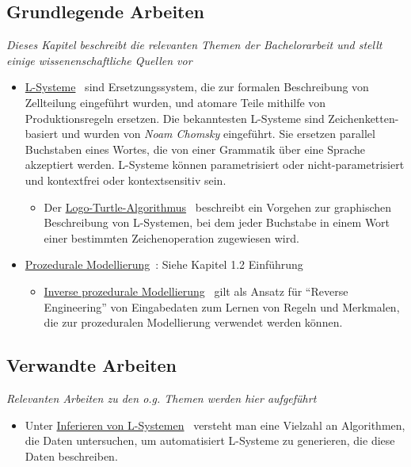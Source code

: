 \documentclass[11pt]{article}
\begin{document}
    \subsection{Grundlegende Arbeiten}
    \textit{Dieses Kapitel beschreibt die relevanten Themen der Bachelorarbeit und stellt einige wissenenschaftliche
    Quellen vor}
    \begin{itemize}
        \item[\ding{46}] \underline{L-Systeme}~\cite{2} sind Ersetzungssystem, die zur
        formalen Beschreibung von Zellteilung eingeführt wurden, und atomare Teile mithilfe von Produktionsregeln
        ersetzen. Die bekanntesten L-Systeme sind Zeichenketten-basiert und wurden von \textit{Noam Chomsky} eingeführt.
        Sie ersetzen parallel Buchstaben eines Wortes, die von einer Grammatik über eine Sprache akzeptiert werden.
        L-Systeme können parametrisiert oder nicht-parametrisiert und kontextfrei oder kontextsensitiv sein.
        \begin{itemize}
            \item[\ding{237}] Der \underline{Logo-Turtle-Algorithmus}~\cite{5} beschreibt ein Vorgehen zur graphischen
            Beschreibung von L-Systemen, bei dem jeder Buchstabe in einem Wort einer bestimmten Zeichenoperation
            zugewiesen wird.
        \end{itemize}
        \item[\ding{46}] \underline{Prozedurale Modellierung}~\cite{1}: Siehe Kapitel 1.2 Einführung
        \begin{itemize}
            \item[\ding{237}] \underline{Inverse prozedurale Modellierung}~\cite{4} gilt als Ansatz für
            "`Reverse Engineering"' von Eingabedaten zum Lernen von Regeln und Merkmalen, die zur prozeduralen
            Modellierung verwendet werden können.
        \end{itemize}
    \end{itemize}

    \subsection{Verwandte Arbeiten}

    \textit{Relevanten Arbeiten zu den o.g. Themen werden hier aufgeführt}

    \begin{itemize}
        \item[\ding{46}] Unter \underline{Inferieren von L-Systemen}~\cite{3} versteht man eine Vielzahl an
        Algorithmen, die Daten untersuchen, um automatisiert L-Systeme zu generieren, die diese Daten beschreiben.
    \end{itemize}
\end{document}
